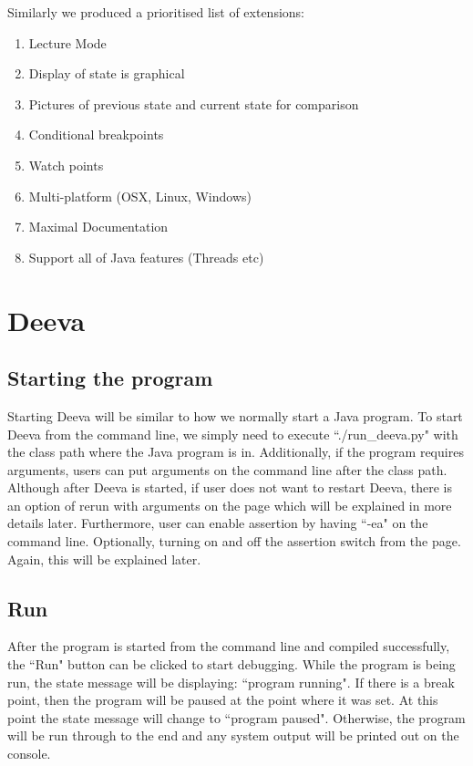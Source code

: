 \documentclass[11pt, a4paper]{article}
\begin{document}
Similarly we produced a prioritised list of extensions:

\begin{enumerate}
\item Lecture Mode
\item Display of state is graphical
\item Pictures of previous state and current state for comparison
\item Conditional breakpoints
\item Watch points
\item Multi-platform (OSX, Linux, Windows)
\item Maximal Documentation
\item Support all of Java features (Threads etc)
\end{enumerate}

\section{Deeva}
\subsection{Starting the program}
Starting Deeva will be similar to how we normally start a Java program.
To start Deeva from the command line, we simply need to execute ``./run\_deeva.py" with the class path where the Java program is in.
Additionally, if the program requires arguments, users can put arguments on the command line after the class path.
Although after Deeva is started, if user does not want to restart Deeva, there is an option of rerun with arguments on the page which will be explained in more details later.
Furthermore, user can enable assertion by having ``-ea" on the command line. Optionally, turning on and off the assertion switch from the page. Again, this will be explained later.
\subsection{Run}
After the program is started from the command line and compiled successfully, the ``Run" button can be clicked to start debugging.
While the program is being run, the state message will be displaying: ``program running".
If there is a break point, then the program will be paused at the point where it was set.
At this point the state message will change to ``program paused".
Otherwise, the program will be run through to the end and any system output will be printed out on the console.
\end{document}

